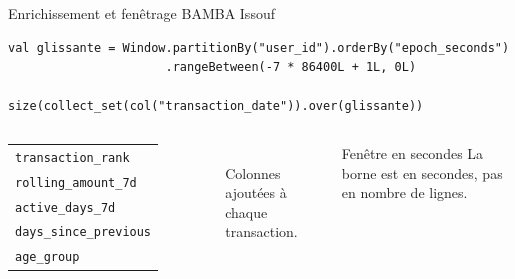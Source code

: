 \documentclass[aspectratio=169,11pt]{beamer}
\newcommand{\legende}[1]{{\color{gris}\footnotesize #1}}
\begin{document}
\begin{frame}[fragile]{Enrichissement et fenêtrage}
  \legende{BAMBA Issouf}

  \vspace{2mm}
\begin{lstlisting}
val glissante = Window.partitionBy("user_id").orderBy("epoch_seconds")
                      .rangeBetween(-7 * 86400L + 1L, 0L)

size(collect_set(col("transaction_date")).over(glissante))
\end{lstlisting}

  \vspace{3mm}
  \begin{columns}[t,onlytextwidth]
      \small
      \begin{tabular}{@{}l@{}}
        \texttt{transaction\_rank} \\
        \texttt{rolling\_amount\_7d} \\
        \texttt{active\_days\_7d} \\
        \texttt{days\_since\_previous} \\
        \texttt{age\_group} \\
      \end{tabular}\\[2mm]
      \legende{Colonnes ajoutées à chaque transaction.}
      \begin{block}{Fenêtre en secondes}
        \footnotesize La borne est en secondes, pas en nombre de lignes.
      \end{block}
  \end{columns}

\end{frame}
\end{document}
